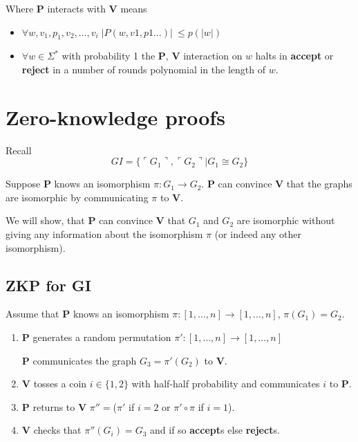 \documentclass[a4paper,12pt]{article}
\theoremstyle{definition}
\theoremstyle{remark}
\begin{document}
Where \textbf{P} interacts with \textbf{V} means
\begin{itemize}
    \item $\forall w, v_1, p_1, v_2, \dots, v_i \; | P(w, v1, p1 \dots) | \: \leq p(|w|)$
    \item $\forall w \in \Sigma^* $ with probability 1 the \textbf{P}, \textbf{V} interaction on $w$ halts in \textbf{accept} or \textbf{reject} in a number of rounds 
    polynomial in the length of $w$.
\end{itemize}







\newpage
\section{Zero-knowledge proofs}

Recall
\begin{equation*}
    GI = \{\ulcorner G_1 \urcorner, \ulcorner G_2 \urcorner | G_1 \cong G_2\}
\end{equation*}

Suppose \textbf{P} knows an isomorphism $\pi: G_1 \to G_2$. \textbf{P} can convince \textbf{V} that the graphs are isomorphic by 
communicating $\pi$ to \textbf{V}.

We will show, that \textbf{P} can convince \textbf{V} that $G_1$ and $G_2$ are isomorphic without giving any information about the isomorphism
$\pi$ (or indeed any other isomorphism).

\subsection{ZKP for GI}
Assume that \textbf{P} knows an isomorphism $\pi: [1, \dots, n] \to [1, \dots, n]$, $\pi (G_1) = G_2$.

\begin{enumerate}
    \item \textbf{P} generates a random permutation $\pi': [1, \dots, n] \to [1, \dots, n]$
    
    \textbf{P} communicates the graph $G_3 = \pi'(G_2)$ to \textbf{V}.

    \item \textbf{V} tosses a coin $i \in \{1, 2\}$ with half-half probability and communicates $i$ to \textbf{P}.
    
    \item \textbf{P} returns to \textbf{V} $\pi'' = $($\pi'$ if $i = 2$ or $\pi' \circ \pi$ if $i = 1$).

    \item \textbf{V} checks that $\pi''(G_i) = G_3$ and if so \textbf{accept}s else \textbf{reject}s.
\end{enumerate}
\end{document}

